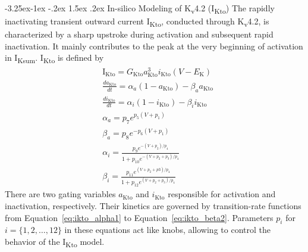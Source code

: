 \documentclass[11pt]{article}
\makeatletter
\renewcommand\subsubsection{\@startsection{subsubsection}{3}{\z@}%
                                    {-3.25ex\@plus -1ex \@minus -.2ex}%
                                     {1.5ex \@plus .2ex}%
                                     {\normalfont\normalsize\fontfamily{phv}\fontsize{14}{17}\selectfont}}
\makeatother
\begin{document}
\subsubsection{In-silico Modeling of K\textsubscript{v}4.2 (I\textsubscript{Kto})}
The rapidly inactivating transient outward current I\textsubscript{Kto}, conducted through K\textsubscript{v}4.2, is characterized by a sharp upstroke during activation and subsequent rapid inactivation. It mainly contributes to the peak at the very beginning of activation in I\textsubscript{Ksum}. I\textsubscript{Kto} is defined by
\begin{align}
    &\mathrm{I}_{\mathrm{Kto}} = G_{\mathrm{Kto}}a_{\mathrm{Kto}}^{3}i_{\mathrm{Kto}}(V-E_{\mathrm{K}}) \\
    &\frac{da_{\mathrm{Kto}}}{dt} = \alpha_{a}(1-a_{\mathrm{Kto}}) - \beta_{a}a_{\mathrm{Kto}} \\
    &\frac{di_{\mathrm{Kto}}}{dt} = \alpha_{i}(1-i_{\mathrm{Kto}}) - \beta_{i}i_{\mathrm{Kto}} \\
    &\alpha_{a} = p_{7}e^{p_{5}(V+p_{1})} \label{eq:ikto_alpha1} \\
    &\beta_{a}= p_{8}e^{-p_6(V+p_{1})} \\
    &\alpha_{i} = \frac{p_{9}e^{-(V+p_{2})/p_{4}}}{1+p_{10}e^{-(V+p_{2}+p_{3})/p_{4}}} \\
    & \beta_{i} = \frac{p_{11}e^{(V+p_{2}+p{3})/p_{4}}}{1+p_{12}e^{(V+p_{2}+p_{3})/p_{4}}} \label{eq:ikto_beta2}
\end{align}
There are two gating variables $a_{\mathrm{Kto}}$ and $i_{\mathrm{Kto}}$ responsible for activation and inactivation, respectively. Their kinetics are governed by transition-rate functions from Equation~\ref{eq:ikto_alpha1} to Equation~\ref{eq:ikto_beta2}. Parameters $p_{i}$ for $i=\{1, 2, \dots, 12\}$ in these equations act like knobs, allowing to control the behavior of the I\textsubscript{Kto} model.
\end{document}
